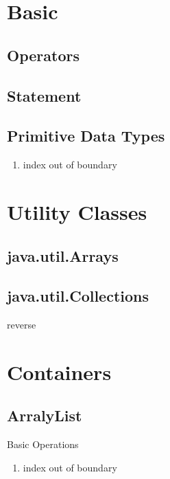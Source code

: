 \chapter{ Basic }



\section{ Operators }

\section{Statement }

\section{ Primitive Data Types }
\begin{enumerate}
    \item index out of boundary


\end{enumerate}

\chapter{ Utility Classes }

\section{java.util.Arrays}


\section{java.util.Collections}

 reverse

\chapter{ Containers }

\section{ArralyList }

Basic Operations 
\begin{enumerate}
    \item index out of boundary


\end{enumerate}


